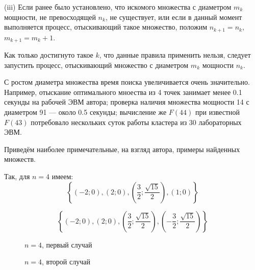 \documentclass{article}
\begin{document}
(iii)
Если ранее было установлено, что искомого множества с диаметром $m_k$ мощности, не превосходящей $n_k$, не существует,
или если в данный момент выполняется процесс, отыскивающий такое множество, положим $n_{k+1} = n_k$, $m_{k+1} = m_k+1$.

Как только достигнуто такое $k$, что данные правила применить нельзя, следует запустить процесс, отыскивающий множество с диаметром $m_k$ мощности $n_k$.


С ростом диаметра множества время поиска увеличивается очень значительно.
Например, отыскание оптимального мноества из 4 точек занимает менее 0.1 секунды на рабочей ЭВМ автора;
проверка наличия множества мощности 14 с диаметром 91 --- около 0.5 секунды;
вычисление же $F(44)$ при известной $F(43)$ потребовало нескольких суток работы кластера из 30 лабораторных ЭВМ.



Приведём наиболее примечательные, на взгляд автора, примеры найденных множеств.

Так, для $n=4$ имеем:
$$
\left\{\left( -2 ; 0\right),\left( 2 ; 0\right),\left( \frac{3}{2} ; \frac{\sqrt{15}}{2}\right),\left( 1 ; 0\right)\right\}
$$

$$
\left\{\left( -2 ; 0\right),\left( 2 ; 0\right),\left( \frac{3}{2} ; \frac{\sqrt{15}}{2}\right),\left( -\frac{3}{2} ; \frac{\sqrt{15}}{2}\right)\right\}
$$


\begin{figure}[h]
\caption{$n=4$, первый случай}
\label{ris:image}
\end{figure}

\begin{figure}[h]
\caption{$n=4$, второй случай}
\label{ris:image}
\end{figure}
\end{document}
